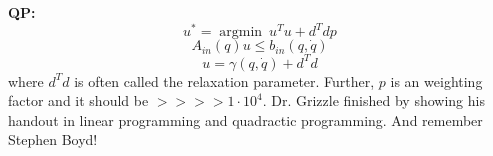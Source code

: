 \documentclass[letterpaper]{article}
\begin{document}
    \textbf{QP:}
    \begin{equation*}
        u^* = \operatorname{argmin}\ u^Tu+d^Tdp
    \end{equation*}
    \begin{equation*}
        A_{in}(q)u\leq b_{in}(q,\dot q)
    \end{equation*}
    \begin{equation*}
        u = \gamma(q, \dot{q})+d^Td
    \end{equation*}
    where $d^Td$ is often called the relaxation parameter. Further, $p$ is an weighting factor and it should be $>>>>1\cdot10^4$. Dr. Grizzle finished by showing his handout in linear programming and quadractic programming. And remember Stephen Boyd!
\end{document}
